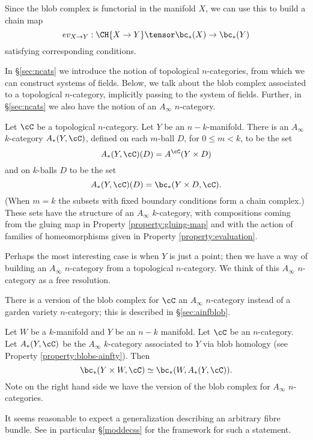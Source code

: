 Since the blob complex is functorial in the manifold $X$, we can use this to build a chain map
$$ev_{X \to Y} : \CH{X \to Y} \tensor \bc_*(X) \to \bc_*(Y)$$
satisfying corresponding conditions.

In \S \ref{sec:ncats} we introduce the notion of topological $n$-categories, from which we can construct systems of fields. Below, we talk about the blob complex associated to a topological $n$-category, implicitly passing to the system of fields. Further, in \S \ref{sec:ncats} we also have the notion of an $A_\infty$ $n$-category.

\begin{property}
\label{property:blobs-ainfty}
Let $\cC$ be  a topological $n$-category.  Let $Y$ be an $n{-}k$-manifold. 
There is an $A_\infty$ $k$-category $A_*(Y, \cC)$, defined on each $m$-ball $D$, for $0 \leq m < k$, to be the set $$A_*(Y,\cC)(D) = A^\cC(Y \times D)$$ and on $k$-balls $D$ to be the set $$A_*(Y, \cC)(D) = \bc_*(Y \times D, \cC).$$ (When $m=k$ the subsets with fixed boundary conditions form a chain complex.) These sets have the structure of an $A_\infty$ $k$-category, with compositions coming from the gluing map in Property \ref{property:gluing-map} and with the action of families of homeomorphisms given in Property \ref{property:evaluation}.
\end{property}
\begin{rem}
Perhaps the most interesting case is when $Y$ is just a point; then we have a way of building an $A_\infty$ $n$-category from a topological $n$-category. We think of this $A_\infty$ $n$-category as a free resolution.
\end{rem}

There is a version of the blob complex for $\cC$ an $A_\infty$ $n$-category
instead of a garden variety $n$-category; this is described in \S \ref{sec:ainfblob}.

\begin{property}
\label{property:product}
Let $W$ be a $k$-manifold and $Y$ be an $n-k$ manifold. Let $\cC$ be an $n$-category.
Let $A_*(Y,\cC)$ be the $A_\infty$ $k$-category associated to $Y$ via blob homology (see Property \ref{property:blobs-ainfty}).
Then
\[
	\bc_*(Y\times W, \cC) \simeq \bc_*(W, A_*(Y,\cC)) .
\]
Note on the right hand side we have the version of the blob complex for $A_\infty$ $n$-categories.
\end{property}
It seems reasonable to expect a generalization describing an arbitrary fibre bundle. See in particular \S \ref{moddecss} for the framework for such a statement.

